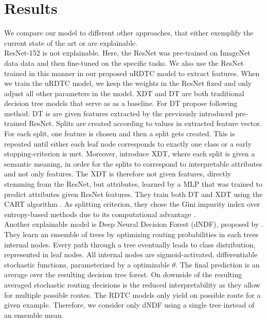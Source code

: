 \documentclass[a4paper,cleardoubleempty,BCOR1cm, 11pt]{report}
\begin{document}
\section{Results}\label{sec:results}
We compare our model to different other approaches, that either exemplify the current state of the art or are explainable.\\
ResNet-152 \cite{he2016deep} is not explainable. Here, the ResNet was pre-trained on ImageNet data \cite{deng2009imagenet} data and then fine-tuned on the specific tasks. We also use the ResNet trained in this manner in our proposed uRDTC model to extract features. When we train the uRDTC model, we keep the weights in the ResNet fixed and only adjust all other parameters in the model.
XDT and DT are both traditional decision tree models that serve as as a baseline. For DT \citet{alaniz2019explainable} propose following method: DT is are given features extracted by the previously introduced pre-trained ResNet. Splits are created according to values in extracted feature vector. For each split, one feature is chosen and then a split gets created. This is repeated until either each leaf node corresponds to exactly one class or a early stopping-criterion is met. Moreover, \citet{alaniz2019explainable} introduce XDT, where each split is given a semantic meaning, in order for the splits to correspond to interpretable attributes and not only features. The XDT is therefore not given features, directly stemming from the ResNet, but attributes, learned by a MLP that was trained to predict attributes given ResNet features. They train both DT and XDT using the CART algorithm \cite{breiman1984classification}. As splitting criterion, they chose the Gini impurity index over entropy-based methods due to its computational advantage \cite{raileanu2004theoretical}.\\
Another explainable model is Deep Neural Decision Forest (dNDF), proposed by \citet{kontschieder2015deep}. They learn an ensemble of trees by optimizing routing probabilities in each trees internal nodes. Every path through a tree eventually leads to class distribution, represented in leaf nodes. All internal nodes are sigmoid-activated, differentiable stochastic functions, parameterized by a optimizable $\theta$. The final prediction is an average over the resulting decision tree forest. On downside of the resulting averaged stochastic routing decisions is the reduced interpretability as they allow for multiple possible routes. The RDTC models only yield on possible route for a given example. Therefore, we consider only dNDF using a single tree instead of an ensemble mean.
\\
\end{document}
